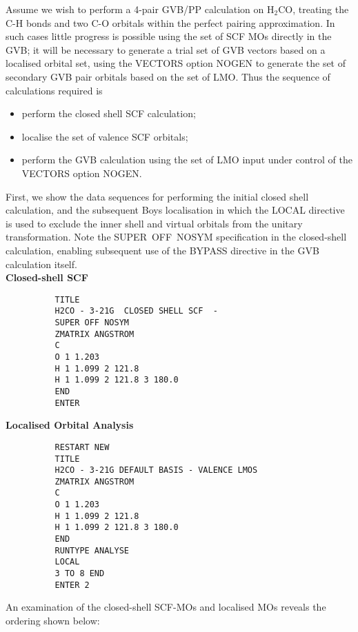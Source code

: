 \documentclass[11pt,fleqn]{article}
\newcommand{\formaldehyde}{\mbox{H$_{2}$CO}}
\begin{document}
Assume we wish to perform a 4-pair GVB/PP calculation on \formaldehyde,
treating the C-H bonds and two C-O orbitals within the
perfect pairing approximation. In such cases little progress is
possible using the set of SCF MOs directly in the GVB; it will be
necessary to generate a trial set of GVB vectors based on
a  localised orbital set, using the VECTORS option NOGEN
to generate the set of secondary GVB pair orbitals based on the
set of LMO. Thus the sequence of calculations required is
\begin{itemize}
\item perform the closed shell SCF calculation;
\item localise the set of valence SCF orbitals;
\item perform the GVB calculation using the set of LMO
input under control of the VECTORS option NOGEN.
\end{itemize}
First, we show the data sequences for performing the initial
closed shell calculation, and the subsequent Boys localisation
in which the LOCAL directive is used to exclude the inner
shell and virtual orbitals from the unitary transformation.
Note the SUPER~OFF~NOSYM specification in the closed-shell
calculation, enabling subsequent use of the BYPASS directive
in the GVB calculation itself.\\

{\bf Closed-shell SCF}
{
\footnotesize
\begin{verbatim}
          TITLE
          H2CO - 3-21G  CLOSED SHELL SCF  -  
          SUPER OFF NOSYM
          ZMATRIX ANGSTROM
          C
          O 1 1.203
          H 1 1.099 2 121.8
          H 1 1.099 2 121.8 3 180.0
          END
          ENTER
\end{verbatim}
}

{\bf Localised Orbital Analysis}
{
\footnotesize
\begin{verbatim}
          RESTART NEW
          TITLE
          H2CO - 3-21G DEFAULT BASIS - VALENCE LMOS
          ZMATRIX ANGSTROM
          C
          O 1 1.203
          H 1 1.099 2 121.8
          H 1 1.099 2 121.8 3 180.0
          END
          RUNTYPE ANALYSE
          LOCAL
          3 TO 8 END
          ENTER 2
\end{verbatim}
}

An examination of the closed-shell SCF-MOs and localised MOs
reveals the  ordering shown below:
 
\end{document}

